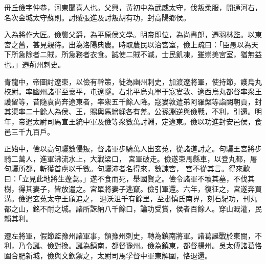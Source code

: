 \begin{pinyinscope}
 
 
 毌丘儉字仲恭，河東聞喜人也。父興，黃初中為武威太守，伐叛柔服，開通河右，名次金城太守蘇則。討賊張進及討叛胡有功，封高陽鄉侯。
 
 
 入為將作大匠。儉襲父爵，為平原侯文學。明帝即位，為尚書郎，遷羽林監。以東宮之舊，甚見親待。出為洛陽典農。時取農民以治宮室，儉上疏曰：「臣愚以為天下所急除者二賊，所急務者衣食。誠使二賊不滅，士民飢凍，雖崇美宮室，猶無益也。」遷荊州刺史。
 
 
 
 
 青龍中，帝圖討遼東，以儉有幹策，徙為幽州刺史，加渡遼將軍，使持節，護烏丸校尉。率幽州諸軍至襄平，屯遼隧。右北平烏丸單于寇婁敦、遼西烏丸都督率衆王護留等，昔隨袁尚奔遼東者，率衆五千餘人降。寇婁敦遣弟阿羅槃等詣闕朝貢，封其渠率二十餘人為侯、王，賜輿馬繒綵各有差。公孫淵逆與儉戰，不利，引還。明年，帝遣太尉司馬宣王統中軍及儉等衆數萬討淵，定遼東。儉以功進封安邑侯，食邑三千九百戶。
 
 
正始中，儉以高句驪數侵叛，督諸軍步騎萬人出玄菟，從諸道討之。句驪王宮將步騎二萬人，進軍沸流水上，大戰梁口，
 宮軍破走。儉遂束馬縣車，以登丸都，屠句驪所都，斬獲首虜以千數。句驪沛者名得來，數諫宮，
 宮不從其言。得來歎曰：「立見此地將生蓬蒿。」遂不食而死，舉國賢之。儉令諸軍不壞其墓，不伐其樹，得其妻子，皆放遣之。宮單將妻子逃竄。儉引軍還。六年，復征之，宮遂奔買溝。儉遣玄菟太守王頎追之，
 過沃沮千有餘里，至肅慎氏南界，刻石紀功，刊丸都之山，銘不耐之城。諸所誅納八千餘口，論功受賞，侯者百餘人。穿山溉灌，民賴其利。
 
 
 
 
 遷左將軍，假節監豫州諸軍事，領豫州刺史，轉為鎮南將軍。諸葛誕戰於東關，不利，乃令誕、儉對換。誕為鎮南，都督豫州。儉為鎮東，都督楊州。吳太傅諸葛恪圍合肥新城，儉與文欽禦之，太尉司馬孚督中軍東解圍，恪退還。
 

\end{pinyinscope}
